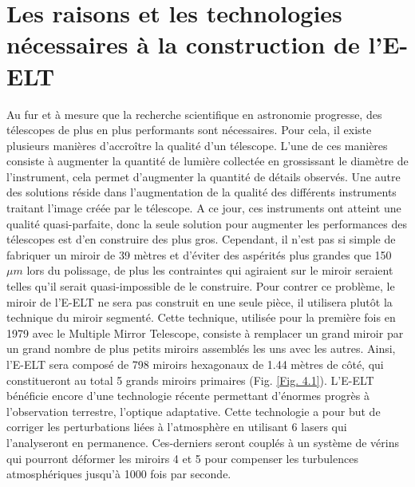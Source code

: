 \section{Les raisons et les technologies nécessaires à la construction de l'E-ELT}\label{4.1}

Au fur et à mesure que la recherche scientifique en astronomie progresse, des télescopes de plus en plus performants sont nécessaires. Pour cela, il existe plusieurs manières d'accroître la qualité d'un télescope. L'une de ces manières consiste à augmenter la quantité de lumière collectée en grossissant le diamètre de l'instrument, cela permet d'augmenter la quantité de détails observés. Une autre des solutions réside dans l'augmentation de la qualité des différents instruments traitant l'image créée par le télescope. A ce jour, ces instruments ont atteint une qualité quasi-parfaite, donc la seule solution pour augmenter les performances des télescopes est d'en construire des plus gros. Cependant, il n'est pas si simple de fabriquer un miroir de 39 mètres et d'éviter des aspérités plus grandes que 150 $\mu m$ lors du polissage, de plus les contraintes qui agiraient sur le miroir seraient telles qu'il serait quasi-impossible de le construire. Pour contrer ce problème, le miroir de l'E-ELT ne sera pas construit en une seule pièce, il utilisera plutôt la technique du miroir segmenté. Cette technique, utilisée pour la première fois en 1979 avec le Multiple Mirror Telescope, consiste à remplacer un grand miroir par un grand nombre de plus petits miroirs assemblés les uns avec les autres. Ainsi, l'E-ELT sera composé de 798 miroirs hexagonaux de 1.44 mètres de côté, qui constitueront au total 5 grands miroirs primaires (Fig. \ref{Fig. 4.1}). L'E-ELT bénéficie encore d'une technologie récente permettant d'énormes progrès à l'observation terrestre, l'optique adaptative. Cette technologie a pour but de corriger les perturbations liées à l'atmosphère en utilisant 6 lasers qui l'analyseront en permanence. Ces-derniers seront couplés à un système de vérins qui pourront déformer les miroirs 4 et 5 pour compenser les turbulences atmosphériques jusqu'à 1000 fois par seconde.